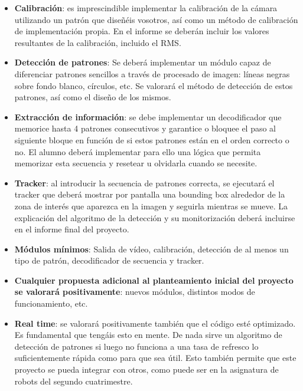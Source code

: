 \begin{itemize}
    \item \textbf{Calibración}: es imprescindible implementar la calibración de la cámara utilizando un patrón que diseñéis vosotros, así como un método de calibración de implementación propia. En el informe se deberán incluir los valores resultantes de la calibración, incluido el RMS.
    \item \textbf{Detección de patrones}: Se deberá implementar un módulo capaz de diferenciar patrones sencillos a través de procesado de imagen: líneas negras sobre fondo blanco, círculos, etc. Se valorará el método de detección de estos patrones, así como el diseño de los mismos.
    \item \textbf{Extracción de información}: se debe implementar un decodificador que memorice hasta 4 patrones consecutivos y garantice o bloquee el paso al siguiente bloque en función de si estos patrones están en el orden correcto o no. El alumno deberá implementar para ello una lógica que permita memorizar esta secuencia y resetear u olvidarla cuando se necesite.
    \item \textbf{Tracker}: al introducir la secuencia de patrones correcta, se ejecutará el tracker que deberá mostrar por pantalla una bounding box alrededor de la zona de interés que aparezca en la imagen y seguirla mientras se mueve. La explicación del algoritmo de la detección y su monitorización deberá incluirse en el informe final del proyecto.
    \item \textbf{Módulos mínimos}: Salida de vídeo, calibración, detección de al menos un tipo de patrón, decodificador de secuencia y tracker.
    \item \textbf{Cualquier propuesta adicional al planteamiento inicial del proyecto se valorará positivamente}: nuevos módulos, distintos modos de funcionamiento, etc.
    \item \textbf{Real time}: se valorará positivamente también que el código esté optimizado. Es fundamental que tengáis esto en mente. De nada sirve un algoritmo de detección de patrones si luego no funciona a una tasa de refresco lo suficientemente rápida como para que sea útil. Esto también permite que este proyecto se pueda integrar con otros, como puede ser en la asignatura de robots del segundo cuatrimestre.
\end{itemize}